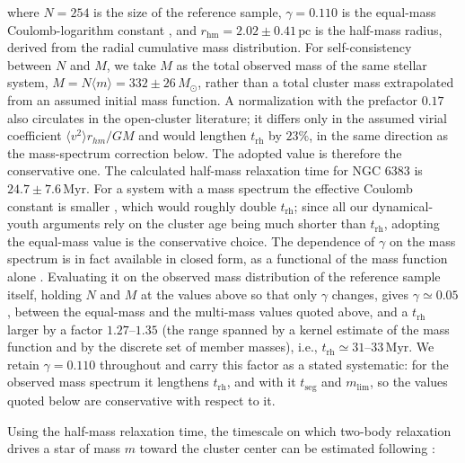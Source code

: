 \documentclass{aa}
\begin{document}
where $N=254$ is the size of the reference sample, $\gamma = 0.110$ is the equal-mass Coulomb-logarithm constant \citep[not to be confused with the HDBSCAN density level $\lambda$ of Sect.~\ref{subsubsec:membership};][]{1994MNRAS.268..257G}, and $r_\mathrm{hm} = 2.02 \pm 0.41\,\mathrm{pc}$ is the half-mass radius, derived from the radial cumulative mass distribution. For self-consistency between $N$ and $M$, we take $M$ as the total observed mass of the same stellar system, $M = N\langle m \rangle = 332 \pm 26\,M_\odot$, rather than a total cluster mass extrapolated from an assumed initial mass function. A normalization with the prefactor $0.17$ also circulates in the open-cluster literature; it differs only in the assumed virial coefficient $\langle v^2\rangle r_{hm}/GM$ \citep[the value $0.4$ adopted here follows][]{1971ApJ...164..399S} and would lengthen $t_{\mathrm{rh}}$ by $23\%$, in the same direction as the mass-spectrum correction below. The adopted value is therefore the conservative one. The calculated half-mass relaxation time for NGC 6383 is $24.7\pm 7.6\,\mathrm{Myr}$. For a system with a mass spectrum the effective Coulomb constant is smaller \citep[$\gamma\simeq0.02$;][]{1996MNRAS.279.1037G}, which would roughly double $t_{\mathrm{rh}}$; since all our dynamical-youth arguments rely on the cluster age being much shorter than $t_{\mathrm{rh}}$, adopting the equal-mass value is the conservative choice. The dependence of $\gamma$ on the mass spectrum is in fact available in closed form, as a functional of the mass function alone \citep[Eqs.~11 and 26]{1975IAUS...69..133H}. Evaluating it on the observed mass distribution of the reference sample itself, holding $N$ and $M$ at the values above so that only $\gamma$ changes, gives $\gamma\simeq0.05$, between the equal-mass and the multi-mass values quoted above, and a $t_{\mathrm{rh}}$ larger by a factor $1.27$--$1.35$ (the range spanned by a kernel estimate of the mass function and by the discrete set of member masses), i.e., $t_{\mathrm{rh}}\simeq31$--$33\,\mathrm{Myr}$. We retain $\gamma=0.110$ throughout and carry this factor as a stated systematic: for the observed mass spectrum it lengthens $t_{\mathrm{rh}}$, and with it $t_{\mathrm{seg}}$ and $m_{\mathrm{lim}}$, so the values quoted below are conservative with respect to it.

Using the half-mass relaxation time, the timescale on which two-body relaxation drives a star of mass $m$ toward the cluster center can be estimated following \citet{1969ApJ...158L.139S}:
\end{document}
